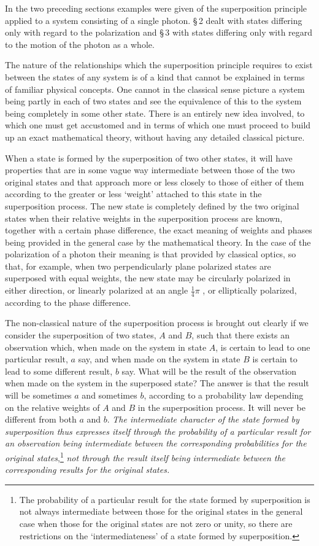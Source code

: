 In the two preceding sections examples were given of the superposition principle applied to a system consisting of a single photon.  \S\,2 dealt with states differing only with regard to the polarization and \S\,3 with states differing only with regard to the motion of the photon as a whole.

The nature of the relationships which the superposition principle requires to exist between the states of any system is of a kind that cannot be explained in terms of familiar physical concepts.  One cannot in the classical sense picture a system being partly in each of two states and see the equivalence of this to the system being completely in some other state.  There is an entirely new idea involved, to which one must get accustomed and in terms of which one must proceed to build up an exact mathematical theory, without having any detailed classical picture.

When a state is formed by the superposition of two other states, it will have properties that are in some vague way intermediate between those of the two original states and that approach more or less closely to those of either of them according to the greater or less `weight' attached to this state in the superposition process.  The new state is completely defined by the two original states when their relative weights in the superposition process are known, together with a certain phase difference, the exact meaning of weights and phases being provided in the general case by the mathematical theory.  In the case of the polarization of a photon their meaning is that provided by classical optics, so that, for example, when two perpendicularly plane polarized states are superposed with equal weights, the new state may be circularly polarized in either direction, or linearly polarized at an angle $\frac{1}{4}\pi$ , or elliptically polarized, according to the phase difference.

The non-classical nature of the superposition process is brought out clearly if we consider the superposition of two states, $A$ and $B$, such that there exists an observation which, when made on the system in state $A$, is certain to lead to one particular result, $a$ say, and when made on the system in state $B$ is certain to lead to some different result, $b$ say.  What will be the result of the observation when made on the system in the superposed state?  The answer is that the result will be sometimes $a$ and sometimes $b$, according to a probability law depending on the relative weights of $A$ and $B$ in the superposition process.  It will never be different from both $a$ and $b$. \emph{The intermediate character of the state formed by superposition thus expresses itself through the probability of a particular result for an observation being intermediate between the corresponding probabilities for the original states},\footnote{The probability of a particular result for the state formed by superposition is not always intermediate between those for the original states in the general case when those for the original states are not zero or unity, so there are restrictions on the `intermediateness' of a state formed by superposition.} \emph{not through the result itself being intermediate between the corresponding results for the original states.}

